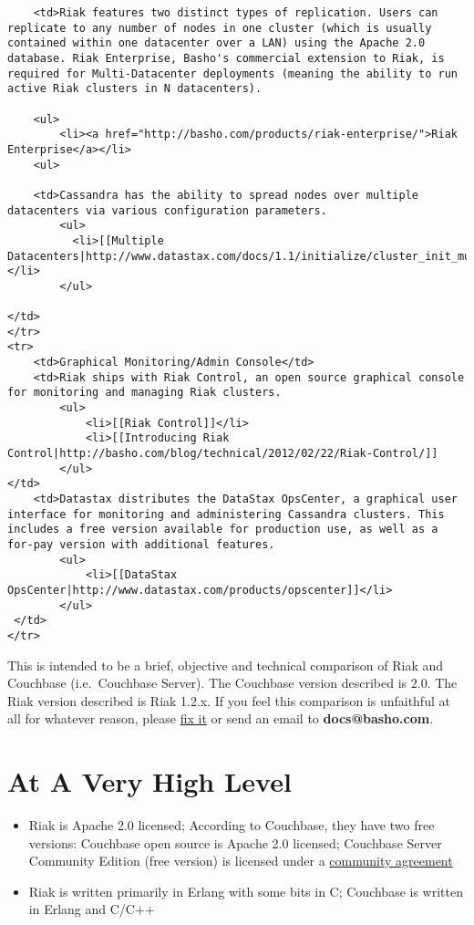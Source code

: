 \documentclass[letter]{book}
\newcounter{tab}[chapter]
\begin{document}
\begin{shaded}
\begin{verbatim}
    <td>Riak features two distinct types of replication. Users can replicate to any number of nodes in one cluster (which is usually contained within one datacenter over a LAN) using the Apache 2.0 database. Riak Enterprise, Basho's commercial extension to Riak, is required for Multi-Datacenter deployments (meaning the ability to run active Riak clusters in N datacenters).

    <ul>
        <li><a href="http://basho.com/products/riak-enterprise/">Riak Enterprise</a></li>
    <ul>

    <td>Cassandra has the ability to spread nodes over multiple datacenters via various configuration parameters.
        <ul>
          <li>[[Multiple Datacenters|http://www.datastax.com/docs/1.1/initialize/cluster_init_multi_dc]]</li>
        </ul>

</td>
</tr>
<tr>
    <td>Graphical Monitoring/Admin Console</td>
    <td>Riak ships with Riak Control, an open source graphical console for monitoring and managing Riak clusters.
        <ul>
            <li>[[Riak Control]]</li>
            <li>[[Introducing Riak Control|http://basho.com/blog/technical/2012/02/22/Riak-Control/]]
        </ul>
</td>
    <td>Datastax distributes the DataStax OpsCenter, a graphical user interface for monitoring and administering Cassandra clusters. This includes a free version available for production use, as well as a for-pay version with additional features.
        <ul>
            <li>[[DataStax OpsCenter|http://www.datastax.com/products/opscenter]]</li>
        </ul>
 </td>
</tr>
\end{verbatim}\end{shaded}

This is intended to be a brief, objective and technical comparison of Riak and Couchbase (i.e.~Couchbase Server). The Couchbase version described is 2.0. The Riak version described is Riak 1.2.x. If you feel this comparison is unfaithful at all for whatever reason, please \href{https://github.com/basho/basho_docs/issues/new}{fix it} or send an email to \textbf{docs@basho.com}.

\section{At A Very High Level}\label{at-a-very-high-level-1}

\begin{itemize}
\itemsep1pt\parskip0pt
\item
  Riak is Apache 2.0 licensed; According to Couchbase, they have two free versions: Couchbase open source is Apache 2.0 licensed; Couchbase Server Community Edition (free version) is licensed under a \href{http://www.couchbase.com/agreement/community}{community agreement}
\item
  Riak is written primarily in Erlang with some bits in C; Couchbase is written in Erlang and C/C++
\end{itemize}
\end{document}
